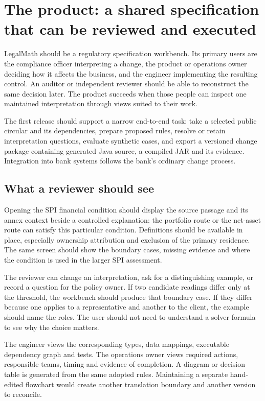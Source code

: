 \section{The product: a shared specification that can be reviewed and executed}
\label{sec:product}

LegalMath should be a regulatory specification workbench. Its primary users are
the compliance officer interpreting a change, the product or operations owner
deciding how it affects the business, and the engineer implementing the resulting
control. An auditor or independent reviewer should be able to reconstruct the
same decision later. The product succeeds when those people can inspect one
maintained interpretation through views suited to their work.

The first release should support a narrow end-to-end task: take a selected public
circular and its dependencies, prepare proposed rules, resolve or retain
interpretation questions, evaluate synthetic cases, and export a versioned change
package containing generated Java source, a compiled JAR and its evidence.
Integration into bank systems follows the bank's ordinary change process.

\subsection{What a reviewer should see}

Opening the SPI financial condition should display the source passage and its
annex context beside a controlled explanation: the portfolio route or the
net-asset route can satisfy this particular condition. Definitions should be
available in place, especially ownership attribution and exclusion of the primary
residence. The same screen should show the boundary cases, missing evidence and
where the condition is used in the larger SPI assessment.

The reviewer can change an interpretation, ask for a distinguishing example, or
record a question for the policy owner. If two candidate readings differ only at
the threshold, the workbench should produce that boundary case. If they differ
because one applies to a representative and another to the client, the example
should name the roles. The user should not need to understand a solver formula
to see why the choice matters.

The engineer views the corresponding types, data mappings, executable dependency
graph and tests. The operations owner views required actions, responsible teams,
timing and evidence of completion. A diagram or decision table is generated from
the same adopted rules. Maintaining a separate hand-edited flowchart would create
another translation boundary and another version to reconcile.


